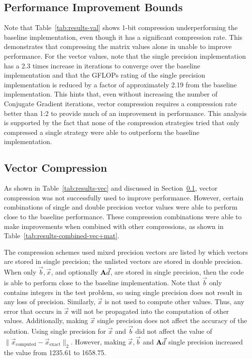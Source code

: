 

\subsection{Performance Improvement Bounds}
\label{sec:results-bounds}
Note that Table~\ref{tab:results-val} shows 1-bit compression underperforming the baseline implementation, even though it has a significant compression rate.
This demonstrates that compressing the matrix values alone in unable to improve performance.
For the vector values, note that the single precision implementation has a 2.3 times increase in iterations to converge over the baseline implementation and that the GFLOPs rating of the single precision implementation is reduced by a factor of approximately 2.19 from the baseline implementation.
This hints that, even without increasing the number of Conjugate Gradient iterations, vector compression requires a compression rate better than 1:2 to provide much of an improvement in performance.
This analysis is supported by the fact that none of the compression strategies tried that only compressed a single strategy were able to outperform the baseline implementation.

\subsection{Vector Compression}
\label{sec:results-vec}
As shown in Table~\ref{tab:results-vec} and discussed in Section~\ref{sec:results-bounds}, vector compression was not successfully used to improve performance.
However, certain combinations of single and double precision vector values were able to perform close to the baseline performance.
These compression combinations were able to make improvements when combined with other compressions, as shown in Table~\ref{tab:results-combined-vec+mat}.

The compression schemes used mixed precision vectors are listed by which vectors are stored in single precision; the unlisted vectors are stored in double precision.
When only \(\vec{b}, \vec{x}\), and optionally \(\mathbf{A}\vec{d}\), are stored in single precision, then the code is able to perform close to the baseline implementation.
Note that \(\vec{b}\) only contains integers in the test problem, so using single precision does not result in any loss of precision.
Similarly, \(\vec{x}\) is not used to compute other values.
Thus, any error that occurs in \(\vec{x}\) will not be propagated into the computation of other values.
Additionally, making \(\vec{x}\) single precision does not affect the accuracy of the solution.
Using single precision for \(\vec{x}\) and \(\vec{b}\) did not affect the value of \(\|\vec{x}_\text{computed} - \vec{x}_\text{exact}\|_2\).
However, making \(\vec{x}, \vec{b}\) and \(\mathbf{A}\vec{d}\) single precision increased the value from 1235.61 to 1658.75.

